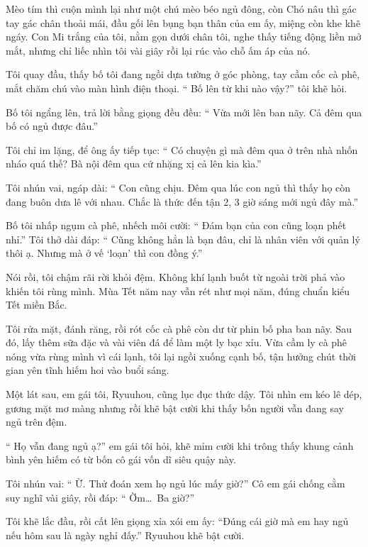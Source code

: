 \documentclass[../main.tex]{subfiles}
\begin{document}
Mèo tím thì cuộn mình lại như một chú mèo béo ngủ đông, còn Chó nâu thì gác tay gác chân thoải mái, đầu gối lên bụng bạn thân của em ấy, miệng còn khe khẽ ngáy. Con Mi trắng của tôi, nằm gọn dưới chân tôi, nghe thấy tiếng động liền mở mắt, nhưng chỉ liếc nhìn tôi vài giây rồi lại rúc vào chỗ ấm áp của nó.

Tôi quay đầu, thấy bố tôi đang ngồi dựa tường ở góc phòng, tay cầm cốc cà phê, mắt chăm chú vào màn hình điện thoại. ``{\color{red} Bố lên từ khi nào vậy?}'' tôi khẽ hỏi.

Bố tôi ngẩng lên, trả lời bằng giọng đều đều: ``{\color{red} Vừa mới lên ban nãy. Cả đêm qua bố có ngủ được đâu.}''

Tôi chỉ im lặng, để ông ấy tiếp tục: ``{\color{red} Có chuyện gì mà đêm qua ở trên nhà nhốn nháo quá thế? Bà nội đêm qua cứ nhặng xị cả lên kia kìa.}''

Tôi nhún vai, ngáp dài: ``{\color{red} Con cũng chịu. Đêm qua lúc con ngủ thì thấy họ còn đang buôn dưa lê với nhau. Chắc là thức đến tận 2, 3 giờ sáng mới ngủ đây mà.}''

Bố tôi nhấp ngụm cà phê, nhếch môi cười: ``{\color{red} Đám bạn của con cũng loạn phết nhỉ.}'' Tôi thở dài đáp: ``{\color{red} Cũng không hẳn là bạn đâu, chỉ là nhân viên với quản lý thôi ạ. Nhưng mà ở vế `loạn' thì con đồng ý.}''

Nói rồi, tôi chậm rãi rời khỏi đệm. Không khí lạnh buốt từ ngoài trời phả vào khiến tôi rùng mình. Mùa Tết năm nay vẫn rét như mọi năm, đúng chuẩn kiểu Tết miền Bắc.

Tôi rửa mặt, đánh răng, rồi rót cốc cà phê còn dư từ phin bố pha ban nãy. Sau đó, lấy thêm sữa đặc và vài viên đá để làm một ly bạc xỉu. Vừa cầm ly cà phê nóng vừa rùng mình vì cái lạnh, tôi lại ngồi xuống cạnh bố, tận hưởng chút thời gian yên tĩnh hiếm hoi vào buổi sáng.

\ct

Một lát sau, em gái tôi, Ryuuhou, cũng lục đục thức dậy. Tôi nhìn em kéo lê dép, gương mặt mơ màng nhưng rồi khẽ bật cười khi thấy bốn người vẫn đang say ngủ trên đệm.

``{\color{red} Họ vẫn đang ngủ ạ?}'' em gái tôi hỏi, khẽ mỉm cười khi trông thấy khung cảnh bình yên hiếm có từ bốn cô gái vốn dĩ siêu quậy này.

Tôi nhún vai: ``{\color{red} Ừ. Thử đoán xem họ ngủ lúc mấy giờ?}'' Cô em gái chống cằm suy nghĩ vài giây, rồi đáp: ``{\color{red} Ờm\dots\ Ba giờ?}''

Tôi khẽ lắc đầu, rồi cất lên giọng xỉa xói em ấy: ``{\color{red}Đúng cái giờ mà em hay ngủ nếu hôm sau là ngày nghỉ đấy.}'' Ryuuhou khẽ bật cười.
\end{document}
